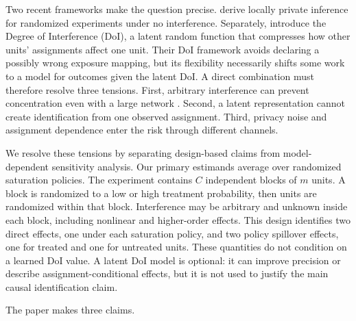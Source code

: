 \documentclass[11pt]{article}
\theoremstyle{definition}
\theoremstyle{remark}
\begin{document}
Two recent frameworks make the question precise. \citet{OhnishiAwan2025} derive locally
private inference for randomized experiments under no interference. Separately,
\citet{OhnishiKarmakarSabbaghi2025} introduce the Degree of Interference (DoI), a latent random
function that compresses how other units' assignments affect one unit. Their DoI framework
avoids declaring a possibly wrong exposure mapping, but its flexibility necessarily shifts some
work to a model for outcomes given the latent DoI. A direct combination must therefore resolve
three tensions. First, arbitrary interference can prevent concentration even with a large
network \citep{BasseAiroldi2018}. Second, a latent representation cannot create identification
from one observed assignment. Third, privacy noise and assignment dependence enter the risk
through different channels.

We resolve these tensions by separating design-based claims from model-dependent sensitivity
analysis. Our
primary estimands average over randomized saturation policies. The experiment contains $C$
independent blocks of $m$ units. A block is randomized to a low or high treatment probability,
then units are randomized within that block. Interference may be arbitrary and unknown inside
each block, including nonlinear and higher-order effects. This design identifies two direct
effects, one under each saturation policy, and two policy spillover effects, one for treated and
one for untreated units. These quantities do not condition on a learned DoI value. A latent DoI
model is optional: it can improve precision or describe assignment-conditional effects, but it
is not used to justify the main causal identification claim.

The paper makes three claims.
\end{document}
